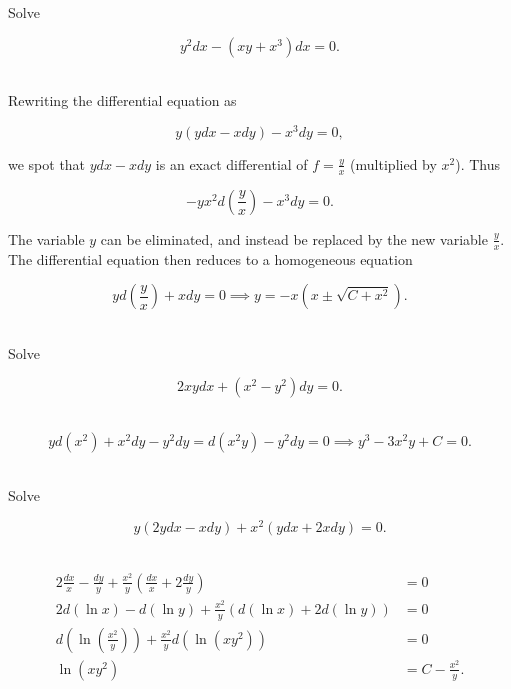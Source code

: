 \documentclass[english,a4paper,12pt]{report}
\begin{document}
{Solve 

\begin{equation}
    y^2dx-(xy+x^3 )dx = 0.
\end{equation}~
}
{Rewriting the differential equation as 

\begin{equation}
    y(ydx-xdy) - x^3 dy = 0,
\end{equation}

we spot that \(ydx - xdy\) is an exact differential of \(\displaystyle f = \frac{y}{x} \) (multiplied by \(x^2\)). Thus

\begin{equation}
    -yx^2 d\left( \frac{y}{x}  \right) - x^3 dy= 0.
\end{equation}

The variable \(y\) can be eliminated, and instead be replaced by the new variable \(\displaystyle \frac{y}{x} \). The differential equation then reduces to a homogeneous equation

\begin{equation}
    y d \left( \frac{y}{x}  \right) + xdy = 0 \implies     y = -x(x\pm \sqrt{C+x^2} ).
\end{equation}~
} 


{Solve 

\begin{equation}
    2xydx+(x^2-y^2)dy = 0.
\end{equation}~
}
{\begin{equation}
    yd(x^2)+x^2dy-y^2dy = d(x^2y)-y^2dy = 0 \implies y^3 - 3x^2y +C = 0.
\end{equation}~
} 


{Solve 

\begin{equation}
    y (2ydx-xdy) + x^2(ydx+2xdy) = 0.
\end{equation}~
}
{\begin{equation}
    \begin{aligned} 
    2 \frac{dx}{x} - \frac{dy}{y} + \frac{x^2}{y}\left( \frac{dx}{x} + 2 \frac{dy}{y}   \right) &= 0 \\
    2d(\ln x) - d(\ln y) + \frac{x^2}{y}(d(\ln x)+2d(\ln y)) &=0 \\
    d\left( \ln (\frac{x^2}{y} ) \right) + \frac{x^2}{y}d(\ln (xy^2)) &= 0 \\ 
    \ln (xy^2) &= C - \frac{x^2}{y}. 
    \end{aligned} 
\end{equation}~
} 
\end{document}
